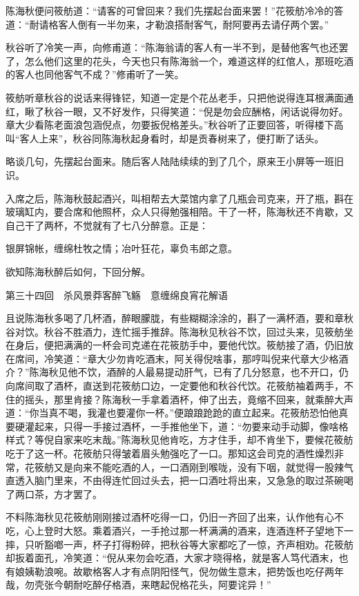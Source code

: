 \documentclass[12pt,UTF8]{ctexbook}
\begin{document}
{{{陈海秋便问筱舫道：“请客的可曾回来？我们先摆起台面来罢！”花筱舫冷冷的答道：“耐请格客人倒有一半勿来，才勒浪搭耐客气，耐阿要再去请仔两个罢。”

秋谷听了冷笑一声，向修甫道：“陈海翁请的客人有一半不到，是替他客气也还罢了，怎么他们这里的花头，今天也只有陈海翁一个，难道这样的红倌人，那班吃酒的客人也同他客气不成？”修甫听了一笑。

筱舫听章秋谷的说话来得锋铓，知道一定是个花丛老手，只把他说得连耳根满面通红，瞅了秋谷一眼，又不好发作，只得笑道：“倪是勿会应酬格，闲话说得勿好。章大少看陈老面浪包涵倪点，勿要扳倪格差头。”秋谷听了正要回答，听得楼下高叫“客人上来”，秋谷同陈海秋起身看时，却是贡春树来了，便打断了话头。

略谈几句，先摆起台面来。随后客人陆陆续续的到了几个，原来王小屏等一班旧识。

入席之后，陈海秋鼓起酒兴，叫相帮去大菜馆内拿了几瓶会司克来，开了瓶，斟在玻璃缸内，要合席和他照杯，众人只得勉强相陪。干了一杯，陈海秋还不肯歇，又自己干了两杯，不觉就有了七八分醉意。正是：

银屏锦帐，缠绵杜牧之情；冶叶狂花，辜负韦郎之意。

欲知陈海秋醉后如何，下回分解。





第三十四回　杀风景莽客醉飞觞　意缠绵良宵花解语





且说陈海秋多喝了几杯酒，醉眼朦胧，有些糊糊涂涂的，斟了一满杯酒，要和章秋谷对饮。秋谷不胜酒力，连忙摇手推辞。陈海秋见秋谷不饮，回过头来，见筱舫坐在身后，便把满满的一杯会司克递在花筱肪手中，要他代饮。筱舫接了酒，仍旧放在席间，冷笑道：“章大少勿肯吃酒末，阿关得倪啥事，那哼叫倪来代章大少格酒介？”陈海秋见他不饮，酒醉的人最易提动肝气，已有了几分怒意，也不开口，仍向席间取了酒杯，直送到花筱舫口边，一定要他和秋谷代饮。花筱舫袖着两手，不住的摇头，那里肯接？陈海秋一手拿着酒杯，伸了出去，竟缩不回来，就乘醉大声道：“你当真不喝，我灌也要灌你一杯。”便踉踉跄跄的直立起来。花筱舫恐怕他真要硬灌起来，只得一手接过酒杯，一手推他坐下，道：“勿要来动手动脚，像啥格样式？等倪自家来吃末哉。”陈海秋见他肯吃，方才住手，却不肯坐下，要候花筱舫吃于了这一杯。花筱舫只得皱着眉头勉强吃了一口。那知这会司克的酒性燥烈非常，花筱舫又是向来不能吃酒的人，一口酒刚到喉咙，没有下咽，就觉得一股辣气直透入脑门里来，不由得连忙回过头去，把一口酒吐将出来，又急急的取过茶碗喝了两口茶，方才罢了。

不料陈海秋见花筱舫刚刚接过酒杯吃得一口，仍旧一齐回了出来，认作他有心不吃，心上登时大怒。乘着酒兴，一手抢过那一杯满满的酒来，连酒连杯子望地下一摔，只听豁啷一声，杯子打得粉碎，把秋谷等大家都吃了一惊，齐声相劝。花筱舫却扳着面孔，冷笑道：“倪从来勿会吃酒，大家才晓得格，就是客人笃代酒末，也有娘姨勒浪啘。故歇格客人才有点阴阳怪气，倪勿做生意末，把势饭也吃仔两年哉，勿壳张今朝耐吃醉仔格酒，来瞎起倪格花头，阿要诧异！”

}}}
\end{document}
